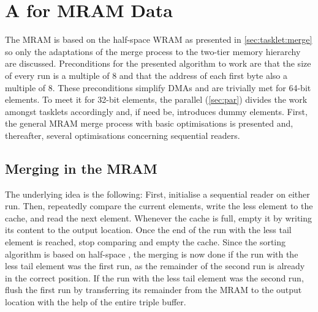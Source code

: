 \section{A \texorpdfstring{\MS{}}{MergeSort} for MRAM Data}
\label{sec:mram:merge}

The MRAM \MS{} is based on the half-space WRAM \MS{} as presented in \cref{sec:tasklet:merge} so only the adaptations of the merge process to the two-tier memory hierarchy are discussed.
Preconditions for the presented algorithm to work are that the size of every run is a multiple of 8 and that the address of each first byte also a multiple of 8.
These preconditions simplify DMAs and are trivially met for 64-bit elements.
To meet it for 32-bit elements, the parallel \MS{} (\cref{sec:par}) divides the work amongst tasklets accordingly and, if need be, introduces dummy elements.
First, the general MRAM merge process with basic optimisations is presented and, thereafter, several optimisations concerning sequential readers.


\subsection{Merging in the MRAM}

The underlying idea is the following:
First, initialise a sequential reader on either run.
Then, repeatedly compare the current elements, write the less element to the cache, and read the next element.
Whenever the cache is full, empty it by writing its content to the output location.
Once the end of the run with the less tail element is reached, stop comparing and empty the cache.
Since the sorting algorithm is based on half-space \MS{}, the merging is now done if the run with the less tail element was the first run, as the remainder of the second run is already in the correct position.
If the run with the less tail element was the second run, flush the first run by transferring its remainder from the MRAM to the output location with the help of the entire triple buffer.

